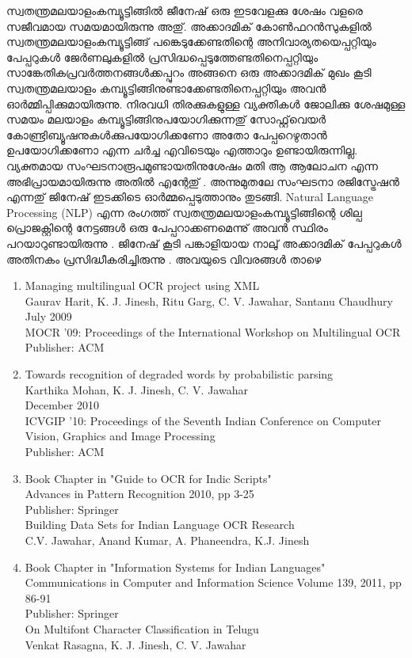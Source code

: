സ്വതന്ത്രമലയാളംകമ്പ്യൂട്ടിങ്ങില്‍ ജീനേഷ് ഒരു ഇടവേളക്കു ശേഷം വളരെ സജീവമായ സമയമായിരുന്നു അതു്. അക്കാദമിക് കോണ്‍ഫറന്‍സുകളില്‍ സ്വതന്ത്രമലയാളംകമ്പ്യൂട്ടിങ്ങ് പങ്കെടുക്കേണ്ടതിന്റെ അനിവാര്യതയെപ്പറ്റിയും പേപ്പറുകള്‍ ജേര്‍ണലുകളില്‍ പ്രസിദ്ധപ്പെടുത്തേണ്ടതിനെപ്പറ്റിയും സാങ്കേതികപ്രവര്‍ത്തനങ്ങള്‍ക്കപ്പുറം അങ്ങനെ ഒരു അക്കാദമിക് മുഖം കൂടി സ്വതന്ത്രമലയാളം കമ്പ്യൂട്ടിങ്ങിനുണ്ടാക്കേണ്ടതിനെപ്പറ്റിയും അവന്‍ ഓര്‍മ്മിപ്പിക്കുമായിരുന്നു. നിരവധി തിരക്കുകളുള്ള വ്യക്തികള്‍ ജോലിക്കു ശേഷമുള്ള സമയം മലയാളം കമ്പ്യൂട്ടിങ്ങിനുപയോഗിക്കുന്നതു് സോഫ്റ്റ്‌വെയര്‍ കോണ്ട്രിബ്യൂഷനുകള്‍ക്കുപയോഗിക്കണോ അതോ പേപ്പറെഴുതാന്‍ ഉപയോഗിക്കണോ എന്ന ചര്‍ച്ച എവിടെയും എത്താറും ഉണ്ടായിരുന്നില്ല. വ്യക്തമായ സംഘടനാരൂപമുണ്ടായതിനുശേഷം മതി ആ ആലോചന എന്ന അഭിപ്രായമായിരുന്നു അതില്‍ എന്റേതു് . അന്നുമുതലേ സംഘടനാ രജിസ്ട്രേഷന്‍ എന്നതു് ജിനേഷ് ഇടക്കിടെ ഓര്‍മ്മപ്പെടുത്താനും തുടങ്ങി. Natural Language Processing (NLP) എന്ന രംഗത്ത് സ്വതന്ത്രമലയാളംകമ്പ്യൂട്ടിങ്ങിന്റെ ശില്പ പ്രൊജക്റ്റിന്റെ നേട്ടങ്ങള്‍ ഒരു പേപ്പറാക്കണമെന്നു് അവന്‍ സ്ഥിരം പറയാറുണ്ടായിരുന്നു .
ജിനേഷ് കൂടി പങ്കാളിയായ  നാലു് അക്കാദമിക് പേപ്പറുകള്‍ അതിനകം പ്രസിദ്ധീകരിച്ചിരുന്നു . അവയുടെ വിവരങ്ങള്‍ താഴെ 

\begin{english}
\begin{enumerate}
\item
Managing multilingual OCR project using XML\\
Gaurav Harit, K. J. Jinesh, Ritu Garg, C. V. Jawahar, Santanu Chaudhury\\
July 2009\\
MOCR '09: Proceedings of the International Workshop on Multilingual OCR\\
Publisher: ACM

\item 
Towards recognition of degraded words by probabilistic parsing\\
Karthika Mohan, K. J. Jinesh, C. V. Jawahar\\
December 2010\\
ICVGIP '10: Proceedings of the Seventh Indian Conference on Computer Vision, Graphics and Image Processing\\
Publisher: ACM

\item
Book Chapter in "Guide to OCR for Indic Scripts"\\
Advances in Pattern Recognition 2010, pp 3-25\\
Publisher: Springer\\
Building Data Sets for Indian Language OCR Research\\
C.V. Jawahar, Anand Kumar, A. Phaneendra, K.J. Jinesh

\item
Book Chapter in "Information Systems for Indian Languages"\\
Communications in Computer and Information Science Volume 139, 2011, pp 86-91\\
Publisher: Springer\\
On Multifont Character Classification in Telugu\\
Venkat Rasagna, K. J. Jinesh, C. V. Jawahar\\
\end{enumerate}
\end{english}

